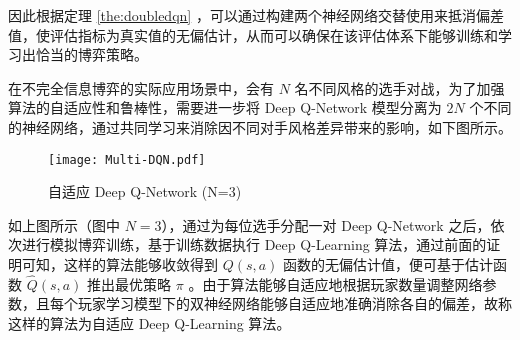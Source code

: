 因此根据定理 \ref{the:doubledqn} ，可以通过构建两个神经网络交替使用来抵消偏差值，使评估指标为真实值的无偏估计，从而可以确保在该评估体系下能够训练和学习出恰当的博弈策略。

在不完全信息博弈的实际应用场景中，会有 $N$ 名不同风格的选手对战，为了加强算法的自适应性和鲁棒性，需要进一步将 Deep Q-Network 模型分离为 $2N$ 个不同的神经网络，通过共同学习来消除因不同对手风格差异带来的影响，如下图所示。

\begin{figure}[H]
    \centering
    \texttt{[image: Multi-DQN.pdf]}
    \caption{自适应 Deep Q-Network (N=3)}
\end{figure}

如上图所示（图中 $N=3$），通过为每位选手分配一对 Deep Q-Network 之后，依次进行模拟博弈训练，基于训练数据执行 Deep Q-Learning 算法，通过前面的证明可知，这样的算法能够收敛得到 $Q(s,a)$ 函数的无偏估计值，便可基于估计函数 $\widehat{Q}(s,a)$ 推出最优策略 $\pi$ 。由于算法能够自适应地根据玩家数量调整网络参数，且每个玩家学习模型下的双神经网络能够自适应地准确消除各自的偏差，故称这样的算法为{\jiacu 自适应 Deep Q-Learning 算法}。